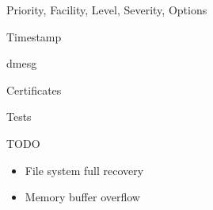 \documentclass[14pt]{beamer}
\begin{document}
\begin{frame}{Priority, Facility, Level, Severity, Options}
\end{frame}

\begin{frame}{Timestamp}
\end{frame}

\begin{frame}{dmesg}
\end{frame}

\begin{frame}{Certificates}
\end{frame}

\begin{frame}{Tests}
\end{frame}

\begin{frame}{TODO}
\begin{itemize}
    \item File system full recovery
    \item Memory buffer overflow
\end{itemize}
\end{frame}
\end{document}
